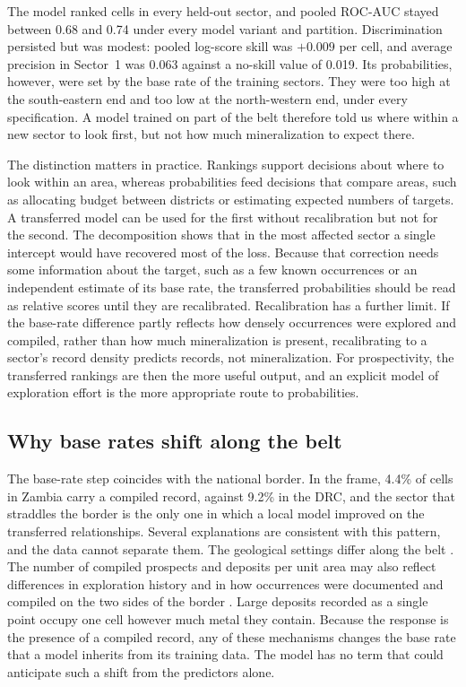 \documentclass[pdflatex,sn-basic]{sn-jnl}%
\begin{document}
The model ranked cells in every held-out sector, and pooled ROC-AUC stayed between 0.68 and 0.74 under every model variant and partition. Discrimination persisted but was modest: pooled log-score skill was $+0.009$ per cell, and average precision in Sector~1 was 0.063 against a no-skill value of 0.019. Its probabilities, however, were set by the base rate of the training sectors. They were too high at the south-eastern end and too low at the north-western end, under every specification. A model trained on part of the belt therefore told us where within a new sector to look first, but not how much mineralization to expect there.

The distinction matters in practice. Rankings support decisions about where to look within an area, whereas probabilities feed decisions that compare areas, such as allocating budget between districts or estimating expected numbers of targets. A transferred model can be used for the first without recalibration but not for the second. The decomposition shows that in the most affected sector a single intercept would have recovered most of the loss. Because that correction needs some information about the target, such as a few known occurrences or an independent estimate of its base rate, the transferred probabilities should be read as relative scores until they are recalibrated. Recalibration has a further limit. If the base-rate difference partly reflects how densely occurrences were explored and compiled, rather than how much mineralization is present, recalibrating to a sector's record density predicts records, not mineralization. For prospectivity, the transferred rankings are then the more useful output, and an explicit model of exploration effort is the more appropriate route to probabilities.

\subsection{Why base rates shift along the belt}

The base-rate step coincides with the national border. In the frame, 4.4\% of cells in Zambia carry a compiled record, against 9.2\% in the DRC, and the sector that straddles the border is the only one in which a local model improved on the transferred relationships. Several explanations are consistent with this pattern, and the data cannot separate them. The geological settings differ along the belt \citep{Cailteux2005, Selley2005, Hitzman2012}. The number of compiled prospects and deposits per unit area may also reflect differences in exploration history and in how occurrences were documented and compiled on the two sides of the border \citep{USGS2014CACB}. Large deposits recorded as a single point occupy one cell however much metal they contain. Because the response is the presence of a compiled record, any of these mechanisms changes the base rate that a model inherits from its training data. The model has no term that could anticipate such a shift from the predictors alone.
\end{document}
